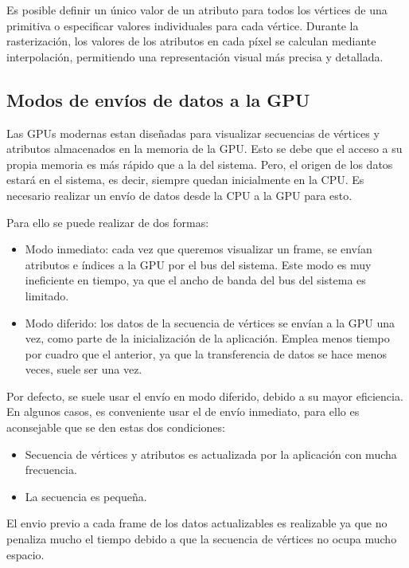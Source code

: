 \documentclass[12pt]{book} %
\providecommand{\tightlist}{%
  \setlength{\itemsep}{0pt}\setlength{\parskip}{0pt}}
\begin{document}
Es posible definir un único valor de un atributo para todos los vértices
de una primitiva o especificar valores individuales para cada vértice.
Durante la rasterización, los valores de los atributos en cada píxel se
calculan mediante interpolación, permitiendo una representación visual
más precisa y detallada.

\hypertarget{modos-de-envuxedos-de-datos-a-la-gpu}{%
\subsection{Modos de envíos de datos a la
GPU}\label{modos-de-envuxedos-de-datos-a-la-gpu}}

Las GPUs modernas estan diseñadas para visualizar secuencias de vértices
y atributos almacenados en la memoria de la GPU. Esto se debe que el
acceso a su propia memoria es más rápido que a la del sistema. Pero, el
origen de los datos estará en el sistema, es decir, siempre quedan
inicialmente en la CPU. Es necesario realizar un envío de datos desde la
CPU a la GPU para esto.

Para ello se puede realizar de dos formas:

\begin{itemize}
\tightlist
\item
  Modo inmediato: cada vez que queremos visualizar un frame, se envían
  atributos e índices a la GPU por el bus del sistema. Este modo es muy
  ineficiente en tiempo, ya que el ancho de banda del bus del sistema es
  limitado.
\item
  Modo diferido: los datos de la secuencia de vértices se envían a la
  GPU una vez, como parte de la inicialización de la aplicación. Emplea
  menos tiempo por cuadro que el anterior, ya que la transferencia de
  datos se hace menos veces, suele ser una vez.
\end{itemize}

Por defecto, se suele usar el envío en modo diferido, debido a su mayor
eficiencia. En algunos casos, es conveniente usar el de envío inmediato,
para ello es aconsejable que se den estas dos condiciones:

\begin{itemize}
\tightlist
\item
  Secuencia de vértices y atributos es actualizada por la aplicación con
  mucha frecuencia.
\item
  La secuencia es pequeña.
\end{itemize}

El envio previo a cada frame de los datos actualizables es realizable ya
que no penaliza mucho el tiempo debido a que la secuencia de vértices no
ocupa mucho espacio.
\end{document}
